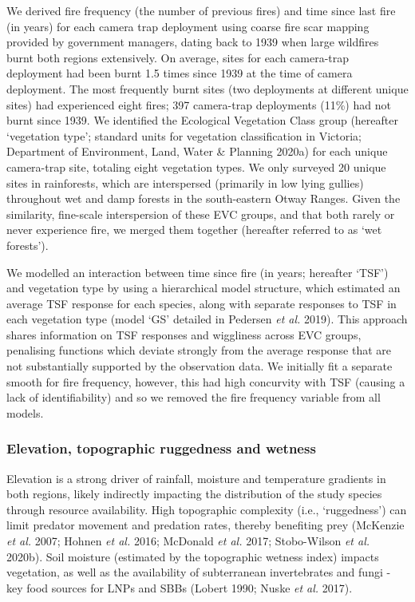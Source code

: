 \documentclass[11pt,a4paper,titlepage,twoside,openright]{style/unimelbthesis}
\begin{document}
\begin{mainmatter}
We derived fire frequency (the number of previous fires) and time since last fire (in years) for each camera trap deployment using coarse fire scar mapping provided by government managers, dating back to 1939 when large wildfires burnt both regions extensively. On average, sites for each camera-trap deployment had been burnt 1.5 times since 1939 at the time of camera deployment. The most frequently burnt sites (two deployments at different unique sites) had experienced eight fires; 397 camera-trap deployments (11\%) had not burnt since 1939. We identified the Ecological Vegetation Class group (hereafter `vegetation type'; standard units for vegetation classification in Victoria; Department of Environment, Land, Water \& Planning 2020a) for each unique camera-trap site, totaling eight vegetation types. We only surveyed 20 unique sites in rainforests, which are interspersed (primarily in low lying gullies) throughout wet and damp forests in the south-eastern Otway Ranges. Given the similarity, fine-scale interspersion of these EVC groups, and that both rarely or never experience fire, we merged them together (hereafter referred to as `wet forests').

We modelled an interaction between time since fire (in years; hereafter `TSF') and vegetation type by using a hierarchical model structure, which estimated an average TSF response for each species, along with separate responses to TSF in each vegetation type (model `GS' detailed in Pedersen \emph{et al.} 2019). This approach shares information on TSF responses and wiggliness across EVC groups, penalising functions which deviate strongly from the average response that are not substantially supported by the observation data. We initially fit a separate smooth for fire frequency, however, this had high concurvity with TSF (causing a lack of identifiability) and so we removed the fire frequency variable from all models.

\hypertarget{elevation-topographic-ruggedness-and-wetness}{%
\subsubsection{Elevation, topographic ruggedness and wetness}\label{elevation-topographic-ruggedness-and-wetness}}

Elevation is a strong driver of rainfall, moisture and temperature gradients in both regions, likely indirectly impacting the distribution of the study species through resource availability. High topographic complexity (i.e., `ruggedness') can limit predator movement and predation rates, thereby benefiting prey (McKenzie \emph{et al.} 2007; Hohnen \emph{et al.} 2016; McDonald \emph{et al.} 2017; Stobo-Wilson \emph{et al.} 2020b). Soil moisture (estimated by the topographic wetness index) impacts vegetation, as well as the availability of subterranean invertebrates and fungi - key food sources for LNPs and SBBs (Lobert 1990; Nuske \emph{et al.} 2017).


\end{mainmatter}
\end{document}

